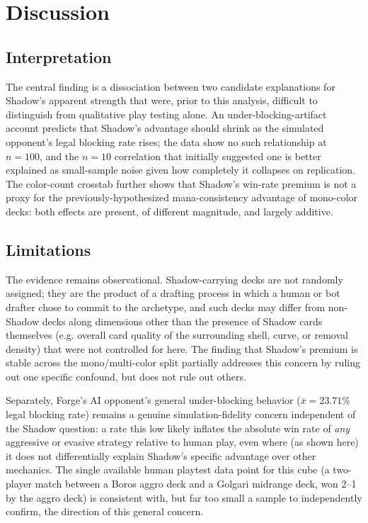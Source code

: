 \documentclass[11pt]{article}
\begin{document}
\section{Discussion}

\subsection{Interpretation}

The central finding is a dissociation between two candidate explanations for
Shadow's apparent strength that were, prior to this analysis, difficult to
distinguish from qualitative play testing alone. An under-blocking-artifact
account predicts that Shadow's advantage should shrink as the simulated
opponent's legal blocking rate rises; the data show no such relationship at
$n=100$, and the $n=10$ correlation that initially suggested one is better
explained as small-sample noise given how completely it collapses on replication.
The color-count crosstab further shows that Shadow's win-rate premium is not a
proxy for the previously-hypothesized mana-consistency advantage of mono-color
decks: both effects are present, of different magnitude, and largely additive.

\subsection{Limitations}

The evidence remains observational. Shadow-carrying decks are not randomly
assigned; they are the product of a drafting process in which a human or bot
drafter chose to commit to the archetype, and such decks may differ from
non-Shadow decks along dimensions other than the presence of Shadow cards
themselves (e.g. overall card quality of the surrounding shell, curve, or
removal density) that were not controlled for here. The finding that Shadow's
premium is stable across the mono/multi-color split partially addresses this
concern by ruling out one specific confound, but does not rule out others.

Separately, Forge's AI opponent's general under-blocking behavior
($\bar{x}=23.71\%$ legal blocking rate) remains a genuine simulation-fidelity
concern independent of the Shadow question: a rate this low likely inflates the
absolute win rate of \emph{any} aggressive or evasive strategy relative to
human play, even where (as shown here) it does not differentially explain
Shadow's specific advantage over other mechanics. The single available human
playtest data point for this cube (a two-player match between a Boros aggro
deck and a Golgari midrange deck, won 2--1 by the aggro deck) is consistent
with, but far too small a sample to independently confirm, the direction of
this general concern.
\end{document}
